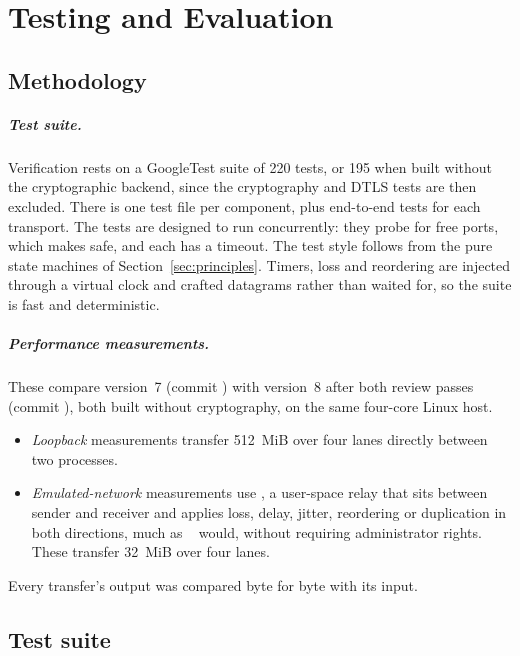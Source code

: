 \chapter{Testing and Evaluation}\label{ch:eval}

\section{Methodology}

\paragraph{Test suite.} Verification rests on a GoogleTest suite of 220 tests, or 195 when built without the
cryptographic backend, since the cryptography and DTLS tests are then excluded. There is one test file per
component, plus end-to-end tests for each transport. The tests are designed to run concurrently: they probe for
free ports, which makes  safe, and each has a timeout. The test style follows from the pure state
machines of Section~\ref{sec:principles}. Timers, loss and reordering are injected through a virtual clock and
crafted datagrams rather than waited for, so the suite is fast and deterministic.

\paragraph{Performance measurements.} These compare version~7 (commit ) with version~8 after both review
passes (commit ), both built  without cryptography, on the same four-core Linux host.
\begin{itemize}
  \item \emph{Loopback} measurements transfer 512~MiB over four lanes directly between two processes.
  \item \emph{Emulated-network} measurements use , a user-space relay that sits between
    sender and receiver and applies loss, delay, jitter, reordering or duplication in both directions, much as
    ~\cite{netem} would, without requiring administrator rights. These transfer 32~MiB over four
    lanes.
\end{itemize}
Every transfer's output was compared byte for byte with its input.

\section{Test suite}

